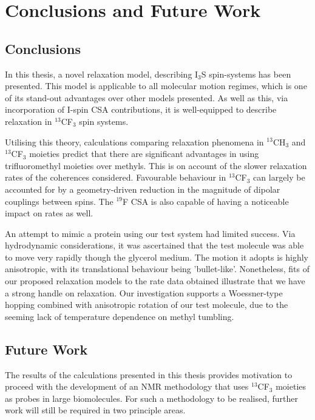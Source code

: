 
\chapter{Conclusions and Future Work}

\section{Conclusions}
In this thesis, a novel relaxation model, describing I$_3$S spin-systems has
been presented. This model is applicable to all molecular motion regimes, which
is one of its stand-out advantages over other models presented. As well as
this, via incorporation of I-spin CSA contributions, it is well-equipped to
describe relaxation in $^{13}$CF$_3$ spin systems.

Utilising this theory, calculations comparing relaxation phenomena in $^{13}$CH$_3$ and $^{13}$CF$_3$ moieties predict that there are significant advantages in using trifluoromethyl moieties over methyls. This is on account of the slower relaxation rates of the coherences considered. Favourable behaviour in $^{13}$CF$_3$ can largely be accounted for by a geometry-driven reduction in the magnitude of dipolar couplings between spins. The $^{19}$F CSA is also capable of having a noticeable impact on rates as well.

An attempt to mimic a protein using our test system had limited success. Via hydrodynamic considerations, it was ascertained that the test molecule was able to move very rapidly though the glycerol medium. The motion it adopts is highly anisotropic, with its translational behaviour being 'bullet-like'. Nonetheless, fits of our proposed relaxation models to the rate data obtained illustrate that we have a strong handle on relaxation. Our investigation supports a Woessner-type hopping combined with anisotropic rotation of our test molecule, due to the seeming lack of temperature dependence on methyl tumbling.

\section{Future Work}
The results of the calculations presented in this thesis provides motivation to proceed with the development of an NMR methodology that uses $^{13}$CF$_3$ moieties as probes in large biomolecules. For such a methodology to be realised, further work will still be required in two principle areas.

